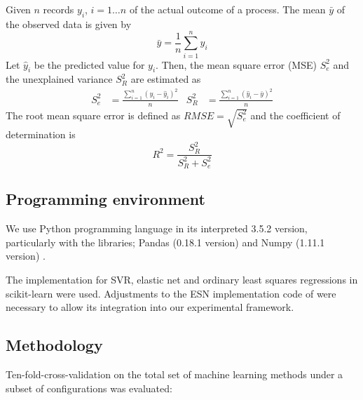 Given $n$ records $y_i$, $i=1\ldots{}n$ of the actual outcome of a
process. The mean $\bar{y}$ of the observed data is given by
\begin{equation*}
  \bar{y} = \frac{1}{n} \sum_{i=1}^{n} y_i
\end{equation*}
Let $\hat{y}_i$ be the predicted value for $y_i$. Then, the mean
square error (MSE) $S_e^2$ and the unexplained variance $S_R^2$ 
are estimated as \citet{Pennstate2017}
\begin{align*}
S_e^2 &= \frac{\sum_{i=1}^{n} {(y_i-\hat{y}_i)}^2 }{n} &
S_R^2 &= \frac{\sum_{i=1}^{n} {(\hat{y}_i-\bar{y})}^2 }{n}
\end{align*}
The root mean square error is defined as $RMSE = \sqrt{S_e^2}$ and the
coefficient of determination is
\begin{equation*}
R^2 = \frac{S_R^2}{S_R^2 + S_e^2}
\end{equation*}
 
\subsection{Programming environment}

We use Python programming language in its interpreted 3.5.2 version,
 particularly with the libraries; Pandas (0.18.1 version)
\citep{mckinneypandas2010} and Numpy (1.11.1 version) \citep{vanderWalt2011}.

The implementation for SVR, elastic net and ordinary least squares
regressions in scikit-learn \citep{scikitlearn2011} were used.
%
Adjustments to the ESN implementation code of \citet{Lukose2012} were
necessary to allow its integration into our experimental
framework.

\subsection{Methodology}

Ten-fold-cross-validation on the total set of
machine learning methods under a subset of configurations was evaluated:

